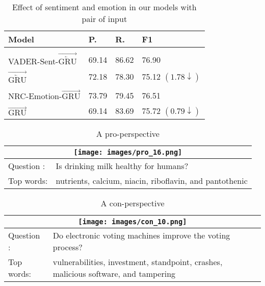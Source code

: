 \documentclass[11pt,a4paper]{article}
\begin{document}
\begin{table*}[!htbp]
    \centering
    \begin{tabular}{|l|l|l|l|}
    \toprule
       Model & P. & R. & F1  \\
        \hline
        &&&\\
        VADER-Sent-$\overrightarrow{\overleftarrow{\text{GRU}}}$ & 69.14  & 86.62  & 76.90\\
        $\overrightarrow{\overleftarrow{\text{GRU}}}$ & 72.18 &  78.30 &  75.12 $(\boldsymbol{1.78\downarrow})$ \\
        \hline
        &&&\\
        NRC-Emotion-$\overrightarrow{\text{GRU}}$ &   73.79 &  79.45 &  76.51\\
        
        $\overrightarrow{\text{GRU}}$ & 69.14 &  83.69  & 75.72 $(\boldsymbol{0.79\downarrow})$\\
        
       \bottomrule
    \end{tabular}
    \caption{Effect of sentiment and emotion in our models with pair of input}
    \label{tab:sentiment}
\end{table*}

\begin{table*}[t]
  \center
  
    \begin{tabular}{|ll|}
    \toprule
    \multicolumn{2}{|c|}{
\texttt{[image: images/pro\_16.png]}
}
 \\
 \hline
 Question : &  Is drinking milk healthy for humans?\\
 Top words: &  nutrients, calcium,  niacin, riboflavin, and pantothenic \\
 \bottomrule
    \end{tabular}
       \caption{A pro-perspective }
    \label{table:pro}
    \end{table*}


\begin{table*}[!htbp]
  \center
  
    \begin{tabular}{|ll|}
    \toprule
    \multicolumn{2}{|c|}{
\texttt{[image: images/con\_10.png]}
}
 \\
 \hline
 Question : & Do electronic voting machines improve the voting process?  \\
 Top words: &  vulnerabilities, investment, standpoint, crashes, malicious software, and tampering  \\
 \bottomrule
    \end{tabular}
       \caption{A con-perspective }
    \label{table:con}
    \end{table*}
    
\end{document}

